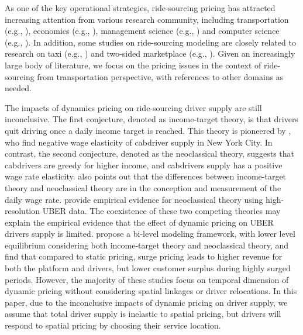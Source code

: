\documentclass[review]{elsarticle}
\begin{document}
As one of the key operational strategies, ride-sourcing pricing has attracted increasing attention from various research community, including transportation (e.g., \citep{zha2018surge, zha2018geometric}), economics (e.g., \citep{chen2016dynamic, bimpikis2019spatial}), management science (e.g., \citep{guda2019your}) and computer science (e.g., \citep{chen2015peeking}). In addition, some studies on ride-sourcing modeling are closely related to research on taxi (e.g., \citep{yang1998network, lagos2000alternative,  yang2010equilibria, yang2011equilibrium, he2018pricing}) and two-sided marketplace (e.g., \cite{rochet2006two, rysman2009economics}). Given an increasingly large body of literature, we focus on the pricing issues in the context of ride-sourcing from transportation perspective, with references to other domains as needed.


The impacts of dynamics pricing on ride-sourcing driver supply are still inconclusive. The first conjecture, denoted as income-target theory, is that drivers quit driving once a daily income target is reached. This theory is pioneered by \cite{camerer1997labor}, who find negative wage elasticity of cabdriver supply in New York City. In contrast, the second conjecture, denoted as the neoclassical theory\citep{farber2005tomorrow}, suggests that cabdrivers are greedy for higher income, and cabdrivers supply has a positive wage rate elasticity. \cite{farber2005tomorrow} also points out that the differences between income-target theory and neoclassical theory are in the conception and measurement of the daily wage rate.  \cite{chen2016dynamic} provide empirical evidence for neoclassical theory using high-resolution UBER data. The coexistence of these two competing theories may explain the empirical evidence that the effect of dynamic pricing on UBER drivers supply is limited\citep{chen2015peeking}.  \cite{zha2018surge} propose a bi-level modeling framework, with lower level equilibrium considering both income-target theory and neoclassical theory, and find that compared to static pricing, surge pricing leads to higher revenue for both the platform and drivers, but lower customer surplus during highly surged periods. However, the majority of these studies focus on temporal dimension of dynamic pricing without considering spatial linkages or driver relocations. In this paper, due to the inconclusive impacts of dynamic pricing on driver supply, we assume that total driver supply is inelastic to spatial pricing, but drivers will respond to spatial pricing by choosing their service location.
\end{document}
